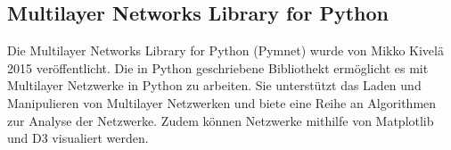 \subsection{Multilayer Networks Library for Python}

Die Multilayer Networks Library for Python (Pymnet) wurde von Mikko Kivelä 2015 veröffentlicht. 
Die in Python geschriebene Bibliothekt ermöglicht es mit Multilayer Netzwerke in Python zu arbeiten. Sie unterstützt das Laden und Manipulieren von Multilayer Netzwerken und biete eine Reihe an Algorithmen zur Analyse der Netzwerke.
Zudem können Netzwerke mithilfe von Matplotlib und D3 visualiert werden.
